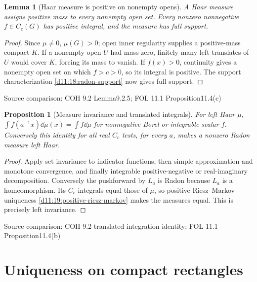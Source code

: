\documentclass[11pt,oneside,openany]{book}
\newtheorem{lemma}[theorem]{Lemma}
\newtheorem{proposition}[theorem]{Proposition}
\theoremstyle{definition}
\theoremstyle{remark}
\newcommand{\family}[1]{}
\newcommand{\source}[1]{\par\begingroup\small\sffamily\color{black!65}Source comparison: #1\par\endgroup}
\begin{document}
\begin{lemma}[Haar measure is positive on nonempty opens]\family{D11.21.haar_positive_open}\label{d11:21:haar-positive-open}
A Haar measure assigns positive mass to every nonempty open set. Every nonzero nonnegative $f\in C_c(G)$ has positive integral, and the measure has full support.
\end{lemma}
\begin{proof}
Since $\mu\ne0$, $\mu(G)>0$; open inner regularity supplies a positive-mass compact $K$. If a nonempty open $U$ had mass zero, finitely many left translates of $U$ would cover $K$, forcing its mass to vanish. If $f(x)>0$, continuity gives a nonempty open set on which $f>c>0$, so its integral is positive. The support characterization \cref{d11:18:radon-support} now gives full support.
\end{proof}
\source{COH 9.2 Lemma9.2.5; FOL 11.1 Proposition11.4(c)}

\begin{proposition}[Measure invariance and translated integrals]\family{D11.21.haar_translation_integral}\label{d11:21:haar-translation-integral}
For left Haar $\mu$, $\int f(a^{-1}x)\dd\mu(x)=\int f\dd\mu$ for nonnegative Borel or integrable scalar $f$. Conversely this identity for all real $C_c$ tests, for every $a$, makes a nonzero Radon measure left Haar.
\end{proposition}
\begin{proof}
Apply set invariance to indicator functions, then simple approximation and monotone convergence, and finally integrable positive-negative or real-imaginary decomposition. Conversely the pushforward by $L_a$ is Radon because $L_a$ is a homeomorphism. Its $C_c$ integrals equal those of $\mu$, so positive Riesz--Markov uniqueness \cref{d11:19:positive-riesz-markov} makes the measures equal. This is precisely left invariance.
\end{proof}
\source{COH 9.2 translated integration identity; FOL 11.1 Proposition11.4(b)}

\section{Uniqueness on compact rectangles}
\end{document}

